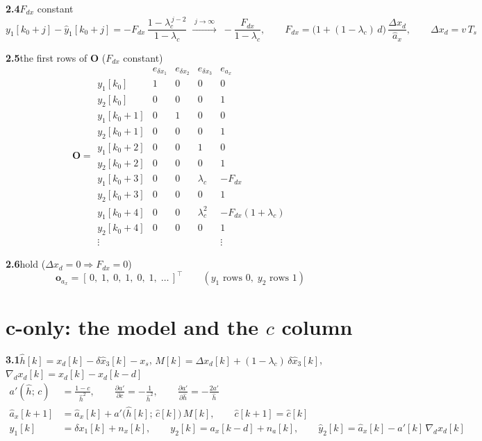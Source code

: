 \documentclass[11pt,a4paper]{ctexart}
\newcommand{\lc}{\lambda_c}
\begin{document}
\textbf{2.4}\quad $F_{dx}$ constant
\[
y_1[k_0+j] - \hat y_1[k_0+j] = -F_{dx}\,\frac{1 - \lc^{\,j-2}}{1 - \lc} \;\xrightarrow{\;j \to \infty\;}\; -\frac{F_{dx}}{1 - \lc},
\qquad
F_{dx} = \big(1 + (1-\lc)\,d\big)\,\frac{\Delta x_d}{\hat a_x}, \qquad \Delta x_d = v\,T_s
\]

\textbf{2.5}\quad the first rows of $\mathbf{O}$ ($F_{dx}$ constant)
\[
\mathbf{O} =
\begin{array}{c|cccc}
 & e_{\delta x_1} & e_{\delta x_2} & e_{\delta x_3} & e_{a_x} \\ \hline
y_1[k_0]   & 1 & 0 & 0 & 0 \\
y_2[k_0]   & 0 & 0 & 0 & 1 \\
y_1[k_0+1] & 0 & 1 & 0 & 0 \\
y_2[k_0+1] & 0 & 0 & 0 & 1 \\
y_1[k_0+2] & 0 & 0 & 1 & 0 \\
y_2[k_0+2] & 0 & 0 & 0 & 1 \\
y_1[k_0+3] & 0 & 0 & \lc & -F_{dx} \\
y_2[k_0+3] & 0 & 0 & 0 & 1 \\
y_1[k_0+4] & 0 & 0 & \lc^2 & -F_{dx}(1+\lc) \\
y_2[k_0+4] & 0 & 0 & 0 & 1 \\
\vdots & & & & \vdots
\end{array}
\]

\textbf{2.6}\quad hold ($\Delta x_d = 0 \Rightarrow F_{dx} = 0$)
\[
\mathbf{o}_{a_x} = [\,0,\;1,\;0,\;1,\;0,\;1,\;\dots\,]^{\top} \qquad (y_1 \text{ rows } 0,\; y_2 \text{ rows } 1)
\]


\clearpage
\section{c-only: the model and the $c$ column}
\small

\textbf{3.1}\quad $\hat h[k] = x_d[k] - \delta\hat x_3[k] - x_s$, \quad $M[k] = \Delta x_d[k] + (1-\lc)\,\delta\hat x_3[k]$, \quad $\nabla_d x_d[k] = x_d[k] - x_d[k-d]$
\[
\begin{aligned}
a'(\hat h;\,c) &= \frac{1-c}{\hat h^{2}}, \qquad
\frac{\partial a'}{\partial c} = -\frac{1}{\hat h^{2}}, \qquad
\frac{\partial a'}{\partial \hat h} = -\frac{2a'}{\hat h} \\
\hat a_x[k+1] &= \hat a_x[k] + a'\big(\hat h[k];\,\hat c[k]\big)\,M[k], \qquad \hat c[k+1] = \hat c[k] \\
y_1[k] &= \delta x_1[k] + n_x[k], \qquad
y_2[k] = a_x[k-d] + n_a[k], \qquad
\hat y_2[k] = \hat a_x[k] - a'[k]\,\nabla_d x_d[k]
\end{aligned}
\]
\end{document}
